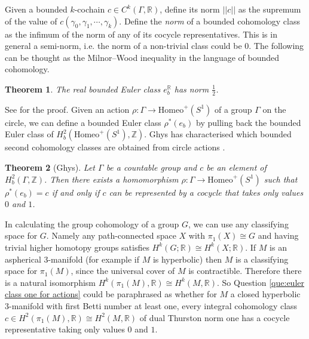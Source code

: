 \documentclass[11pt]{amsart}
\newtheorem{thm}{Theorem}[section]
\theoremstyle{remark}
\theoremstyle{definition}
\begin{document}
	Given a bounded $k$-cochain $c \in C^k(\Gamma, \mathbb{R})$, define its norm $||c||$ as the supremum of the value of $c(\gamma_0 , \gamma_1, \cdots, 
	\gamma_k)$. Define the \emph{norm} of a bounded cohomology class as the infimum of the norm of any of its cocycle representatives. This is in general a semi-norm, i.e. the norm of a non-trivial class could be $0$. The following can be thought as the Milnor--Wood inequality in the language of bounded cohomology.
	
	
	\begin{thm}
		The real bounded Euler class $e_b^\mathbb{R} $ has norm $\frac{1}{2}$. 
	\end{thm}


	See \cite{ghys2001groups} for the proof. Given an action $\rho \colon \Gamma \rightarrow \mathrm{Homeo}^+(S^1)$ of a group $\Gamma$ on the circle, we can define a bounded Euler class $\rho^*(e_b)$ by pulling back the bounded Euler class of $H^2_b(\mathrm{Homeo}^+(S^1) , \mathbb{Z})$. Ghys has characterised which bounded second cohomology classes are obtained from circle actions \cite{ghys1987groupes, ghys2001groups}. 

	\begin{thm}[Ghys]
		Let $\Gamma$ be a countable group and $c$ be an element of $H^2_b(\Gamma , \mathbb{Z})$. Then there exists a homomorphism $\rho \colon \Gamma \rightarrow \mathrm{Homeo}^+(S^1)$ such that $\rho^*(e_b) = c$ if and only if $c$ can be represented by a cocycle that takes only values $0$ and $1$. 
	\end{thm}
	
	In calculating the group cohomology of a group $G$, we can use any classifying space for $G$. Namely any path-connected space $X$ with $\pi_1(X) \cong G$ and having trivial higher homotopy groups satisfies $H^k(G ; \mathbb{R}) \cong H^k(X ; \mathbb{R})$. If $M$ is an aspherical 3-manifold (for example if $M$ is hyperbolic) then $M$ is a classifying space for $\pi_1(M)$, since the universal cover of $M$ is contractible. Therefore there is a natural isomorphism $H^k(\pi_1(M), \mathbb{R}) \cong H^k(M , \mathbb{R})$. So Question \ref{que:euler class one for actions} could be paraphrased as whether for $M$ a closed hyperbolic 3-manifold with first Betti number at least one, every integral cohomology class $c \in H^2(\pi_1(M), \mathbb{R}) \cong H^2(M , \mathbb{R})$ of dual Thurston norm one has a cocycle representative taking only values $0$ and $1$. 
\end{document}
